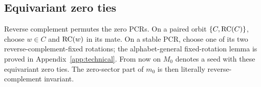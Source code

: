 \subsection{Equivariant zero ties}

Reverse complement permutes the zero PCRs.  On a paired orbit
$\{C,\operatorname{RC}(C)\}$, choose $w\in C$ and $\operatorname{RC}(w)$ in its mate.  On a stable PCR,
choose one of its two reverse-complement-fixed rotations; the
alphabet-general fixed-rotation lemma is proved in
Appendix~\ref{app:technical}.  From now on $M_0$ denotes a seed with these
equivariant zero ties.  The zero-sector part of $m_0$ is then literally
reverse-complement invariant.
